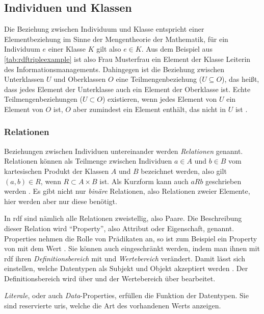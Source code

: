 \subsection{Individuen und Klassen}
\label{sec:individuenundklassen}
Die Beziehung zwischen Individuum und Klasse entspricht einer Elementbeziehung im Sinne der Mengentheorie der Mathematik, für ein Individuum $e$ einer Klasse $K$ gilt also $e \in K$.
Aus dem Beispiel aus \cref{tab:rdftripleexample} ist also Frau Musterfrau ein Element der Klasse Leiterin des Informationsmanagements.
Dahingegen ist die Beziehung zwischen Unterklassen $U$ und Oberklassen $O$ eine Teilmengenbeziehung ($U \subseteq O$), das heißt, dass jedes Element der Unterklasse auch ein Element der Oberklasse ist.
Echte Teilmengenbeziehungen ($U \subset O$) existieren, wenn jedes Element von $U$ ein Element von $O$ ist, $O$ aber zumindest ein Element enthält, das nicht in $U$ ist \citep[S.~261]{semanticwebgrundlagen}.

\subsubsection{Relationen}
Beziehungen zwischen Individuen untereinander werden \emph{Relationen} genannt.
Relationen können als Teilmenge zwischen Individuen $a \in A$ und $b \in B$ vom kartesischen Produkt der Klassen $A$ und $B$ bezeichnet werden, also gilt $(a,b) \in R$, wenn $R \subset A \times B$ ist.
Als Kurzform kann auch $aRb$ geschrieben werden \citep[S.~263]{semanticwebgrundlagen}.
Es gibt nicht nur \emph{binäre} Relationen, also Relationen zweier Elemente, hier werden aber nur diese benötigt.

In \ac{rdf} sind nämlich alle Relationen zweistellig, also Paare.
Die Beschreibung dieser Relation wird \enquote{Property}, also Attribut oder Eigenschaft, genannt.
Properties nehmen die Rolle von Prädikaten an, so ist zum Beispiel  ein Property von  mit dem Wert .
Sie können auch eingeschränkt werden, indem man ihnen mit \ac{rdf} ihren \emph{Definitionsbereich} mit und \emph{Wertebereich} verändert.
Damit lässt sich einstellen, welche Datentypen als Subjekt und Objekt akzeptiert werden \citep[S.~76]{semanticwebgrundlagen}.
Der Definitionsbereich wird über  und der Wertebereich über  bearbeitet.

\emph{Literale}, oder auch \emph{Data}-Properties, erfüllen die Funktion der Datentypen.
Sie sind reservierte \acp{uri}, welche die Art des vorhandenen Werts anzeigen.

